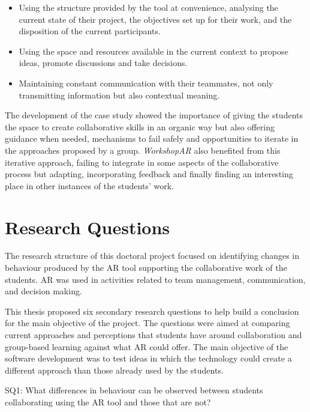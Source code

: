 \begin{itemize}
    \item Using the structure provided by the tool at convenience, analysing the current state of their project, the objectives set up for their work, and the disposition
    of the current participants.
    \item Using the space and resources available in the current context to propose ideas, promote discussions and take decisions.
    \item Maintaining constant communication with their teammates, not only transmitting information but also contextual meaning.
\end{itemize}

The development of the case study showed the importance of giving the students the space to create collaborative skills in an organic way but also offering guidance when
needed, mechanisms to fail safely and opportunities to iterate in the approaches proposed by a group. \emph{WorkshopAR} also benefited from this iterative approach,
failing to integrate in some aspects of the collaborative process but adapting, incorporating feedback and finally finding an interesting place in other instances of the
students' work.

\section{Research Questions \label{sec:7-1}}

The research structure of this doctoral project focused on identifying changes in behaviour produced by the \ac{AR} tool supporting the collaborative work of the students.
\ac{AR} was used in activities related to team management, communication, and decision making.

This thesis proposed six secondary research questions to help build a conclusion for the main objective of the project. The questions were aimed at comparing current
approaches and perceptions that students have around collaboration and group-based learning against what \ac{AR} could offer. The main objective of the software
development was to test ideas in which the technology could create a different approach than those already used by the students.

\begin{displayquote}
    SQ1: What differences in behaviour can be observed between students collaborating using the \ac{AR} tool and those that are not?
\end{displayquote}

